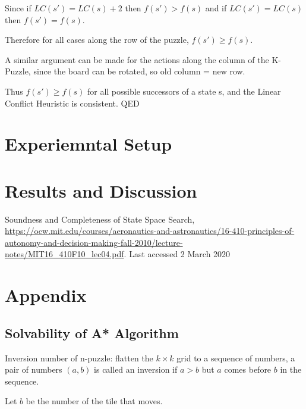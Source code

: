 \documentclass{llncs}
\begin{document}
Since if $LC(s') = LC(s) + 2$ then $f(s') > f(s)$ and if $LC(s') = LC(s)$ then $f(s') = f(s)$.

Therefore for all cases along the row of the puzzle, $f(s') \geq f(s)$. 

A similar argument can be made for the actions along the column of the K-Puzzle, since the board can be rotated, so old column = new row.

Thus $f(s') \geq f(s)$ for all possible successors of a state s, and the Linear Conflict Heuristic is consistent. QED

\section{Experiemntal Setup}
\section{Results and Discussion}


\begin{thebibliography}{8}
Soundness and Completeness of State Space Search, \url{https://ocw.mit.edu/courses/aeronautics-and-astronautics/16-410-principles-of-autonomy-and-decision-making-fall-2010/lecture-notes/MIT16\_410F10\_lec04.pdf}. Last accessed 2 March 2020
\end{thebibliography}

\section{Appendix}
\subsection{Solvability of A* Algorithm}
\begin{definition}
Inversion number of n-puzzle: flatten the $k \times k$ grid to a sequence of numbers, a pair of numbers $(a,b)$ is called an inversion if $a>b$ but $a$ comes before $b$ in the sequence.
\end{definition}
Let $b$ be the number of the tile that moves.
\end{document}
